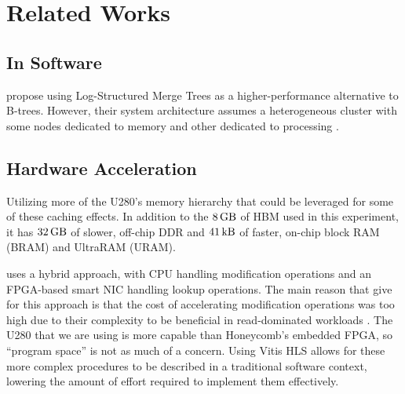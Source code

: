 \section{Related Works}

\subsection{In Software}

\citeauthor{dlsm} propose using Log-Structured Merge Trees as a higher-performance alternative to B-trees. However, their system architecture assumes a heterogeneous cluster with some nodes dedicated to memory and other dedicated to processing \autocite{dlsm}.


\subsection{Hardware Acceleration}

Utilizing more of the U280's memory hierarchy that could be leveraged for some of these caching effects. In addition to the $\SI{8}{\giga\byte}$ of HBM used in this experiment, it has $\SI{32}{\giga\byte}$ of slower, off-chip DDR and $\SI{41}{\kilo\byte}$ of faster, on-chip block RAM (BRAM) and UltraRAM (URAM).

 uses a hybrid approach, with CPU handling modification operations and an FPGA-based smart NIC handling lookup operations. The main reason that \citeauthor{honeycomb} give for this approach is that the cost of accelerating modification operations was too high due to their complexity to be beneficial in read-dominated workloads \autocite{honeycomb}. The U280 that we are using is more capable than Honeycomb's embedded FPGA, so ``program space'' is not as much of a concern. Using Vitis HLS allows for these more complex procedures to be described in a traditional software context, lowering the amount of effort required to implement them effectively.
